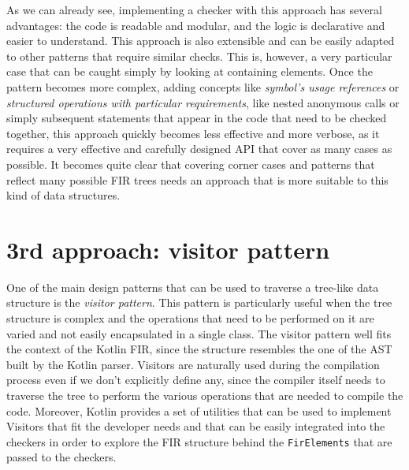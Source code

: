 \documentclass[12pt,a4paper,openright,twoside]{book}
\begin{document}




As we can already see, implementing a checker with this approach has several
advantages: the code is readable and modular, and the logic is
declarative and easier to understand. This approach is also extensible and
can be easily adapted to other patterns that require similar checks.
%
This is, however, a very particular case that can be caught simply by looking at
containing elements. Once the pattern becomes more complex, adding concepts like
\emph{symbol's usage references} or \emph{structured operations with particular
requirements}, like nested anonymous calls or simply subsequent statements that
appear in the code that need to be checked together, this approach quickly
becomes less effective and more verbose, as it requires a very effective and
carefully designed API that cover as many cases as possible. 
%
It becomes quite clear that covering corner cases and patterns that reflect many
possible \ac{FIR} trees needs an approach that is more suitable to this kind of
data structures.

\section{3rd approach: visitor pattern}

One of the main design patterns that can be used to traverse a tree-like data 
structure is the \emph{visitor pattern}. This pattern is particularly useful 
when the tree structure is complex and the operations that need to be performed
on it are varied and not easily encapsulated in a single class.
%
The visitor pattern well fits the context of the Kotlin \ac{FIR}, since the
structure resembles the one of the \ac{AST} built by the Kotlin parser. 
Visitors are naturally used during the compilation process even if we don't
explicitly define any, since the compiler itself needs to traverse the tree to
perform the various operations that are needed to compile the code.
%
Moreover, Kotlin provides a set of utilities that can be used to implement
Visitors that fit the developer needs and that can be easily integrated into the
checkers in order to explore the \ac{FIR} structure behind the
\lstinline{FirElements} that are passed to the checkers.
\end{document}

